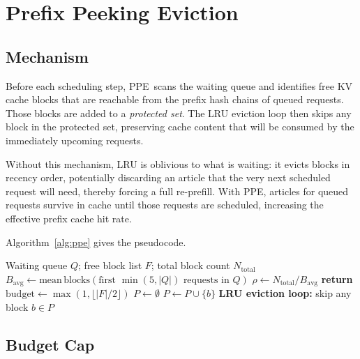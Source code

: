 \documentclass[journal]{IEEEtran}
\newcommand{\ppe}{\textsc{PPE}}
\newcommand{\rhomin}{\rho_{\min}}
\begin{document}
\section{Prefix Peeking Eviction}
\label{sec:ppe}

\subsection{Mechanism}

Before each scheduling step, \ppe\ scans the waiting queue and identifies
free KV cache blocks that are reachable from the prefix hash chains of
queued requests.  Those blocks are added to a \emph{protected set}.  The
LRU eviction loop then skips any block in the protected set, preserving cache
content that will be consumed by the immediately upcoming requests.

Without this mechanism, LRU is oblivious to what is waiting: it evicts blocks
in recency order, potentially discarding an article that the very next
scheduled request will need, thereby forcing a full re-prefill.  With \ppe,
articles for queued requests survive in cache until those requests are
scheduled, increasing the effective prefix cache hit rate.

Algorithm~\ref{alg:ppe} gives the pseudocode.

\begin{algorithm}[t]
\caption{Prefix Peeking Eviction (\ppe)}
\label{alg:ppe}
\begin{algorithmic}[1]
\Require Waiting queue $Q$; free block list $F$; total block count $N_{\mathrm{total}}$
\State $B_{\mathrm{avg}} \gets \mathrm{mean\,blocks}(\text{first } \min(5, |Q|) \text{ requests in } Q)$
\State $\rho \gets N_{\mathrm{total}} / B_{\mathrm{avg}}$
\If{$\rho < \rhomin$} \textbf{return} 
\EndIf
\State $\mathrm{budget} \gets \max(1, \lfloor |F| / 2 \rfloor)$
\State $P \gets \emptyset$ 
      \State $P \gets P \cup \{b\}$
    \EndIf
  \EndFor
\EndFor
\State \textbf{LRU eviction loop:} skip any block $b \in P$
\end{algorithmic}
\end{algorithm}

\subsection{Budget Cap}
\end{document}
